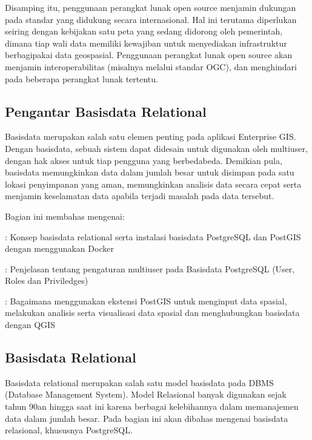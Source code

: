 \documentclass[letterpaper,10pt,english]{sphinxmanual}
\begin{document}
Disamping itu, penggunaan perangkat lunak open source menjamin dukungan pada standar yang didukung secara internasional. Hal ini terutama diperlukan seiring dengan kebijakan satu peta yang sedang didorong oleh pemerintah, dimana tiap wali data memiliki kewajiban untuk menyediakan infrastruktur berbagi\sphinxhyphen{}pakai data geospasial. Penggunaan perangkat lunak open source akan menjamin interoperabilitas (misalnya melalui standar OGC), dan menghindari  pada beberapa perangkat lunak tertentu.


\subsection{Pengantar Basisdata Relational}
\label{\detokenize{sesi2/intrordbms:pengantar-basisdata-relational}}\label{\detokenize{sesi2/intrordbms::doc}}
Basisdata merupakan salah satu elemen penting pada aplikasi Enterprise GIS. Dengan basisdata, sebuah sistem dapat didesain untuk digunakan oleh multi\sphinxhyphen{}user, dengan hak akses untuk tiap pengguna yang berbeda\sphinxhyphen{}beda. Demikian pula, basisdata memungkinkan data dalam jumlah besar untuk disimpan pada satu lokasi penyimpanan yang aman, memungkinkan analisis data secara cepat serta menjamin keselamatan data apabila terjadi masalah pada data tersebut.

Bagian ini membahas mengenai:

 {\hyperref[\detokenize{sesi2/relationaldb::doc}]{}}
: Konsep basisdata relational serta instalasi basisdata PostgreSQL dan PostGIS dengan menggunakan Docker

 {\hyperref[\detokenize{sesi2/dbmanagement::doc}]{}}
: Penjelasan tentang pengaturan multi\sphinxhyphen{}user pada Basisdata PostgreSQL (User, Roles dan Priviledges)

 {\hyperref[\detokenize{sesi2/postgisquery::doc}]{}}
: Bagaimana menggunakan ekstensi PostGIS untuk menginput data spasial, melakukan analisis serta visualisasi data spasial dan menghubungkan basisdata dengan QGIS






\subsection{Basisdata Relational}
\label{\detokenize{sesi2/relationaldb:basisdata-relational}}\label{\detokenize{sesi2/relationaldb::doc}}
Basisdata relational merupakan salah satu model basisdata pada DBMS (Database Management System). Model Relasional banyak digunakan sejak tahun 90an hingga saat ini karena berbagai kelebihannya dalam memanajemen data dalam jumlah besar. Pada bagian ini akan dibahas mengenai basisdata relasional, khususnya PostgreSQL.
\end{document}
